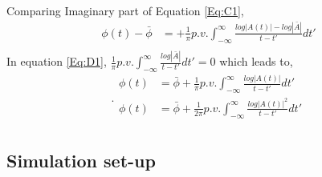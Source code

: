 Comparing Imaginary part of Equation \ref{Eq:C1},
\begin{equation}
\begin{split}
\phi(t)-\bar{\phi} &= + \frac{1}{\pi} p.v. \int_{-\infty}^{\infty} \frac{log|A(t)|-log|\bar{A}|}{t-t'} dt'\\
\end{split}
\label{Eq:D1}
\end{equation}
In equation \ref{Eq:D1}, $\frac{1}{\pi} p.v. \int_{-\infty}^{\infty} \frac{log|\bar{A}|}{t-t'} dt'=0$ which leads to,
\begin{equation}.
\begin{split}
\phi(t) &= \bar{\phi} + \frac{1}{\pi} p.v. \int_{-\infty}^{\infty} \frac{log|A(t)|}{t-t'} dt'\\
\phi(t) &= \bar{\phi} + \frac{1}{2\pi} p.v. \int_{-\infty}^{\infty} \frac{log|A(t)|^2}{t-t'} dt'\\
\end{split}
\label{Eq:E1}
\end{equation}



\newpage
\subsection{Simulation set-up}
